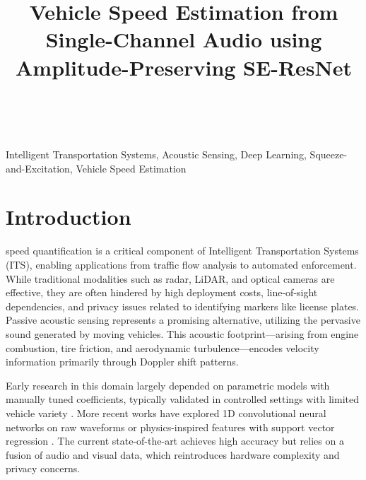 \documentclass[conference]{IEEEtran}
\begin{document}
\title{Vehicle Speed Estimation from Single-Channel Audio using Amplitude-Preserving SE-ResNet\\
}

\author{ \\
}

\maketitle

\begin{abstract}
\end{abstract}

\begin{IEEEkeywords}
Intelligent Transportation Systems, Acoustic Sensing, Deep Learning, Squeeze-and-Excitation, Vehicle Speed Estimation
\end{IEEEkeywords}

\section{Introduction}
\label{sec:introduction}
 speed quantification is a critical component of Intelligent Transportation Systems (ITS), enabling applications from traffic flow analysis to automated enforcement. While traditional modalities such as radar, LiDAR, and optical cameras are effective, they are often hindered by high deployment costs, line-of-sight dependencies, and privacy issues related to identifying markers like license plates. Passive acoustic sensing represents a promising alternative, utilizing the pervasive sound generated by moving vehicles. This acoustic footprint—arising from engine combustion, tire friction, and aerodynamic turbulence—encodes velocity information primarily through Doppler shift patterns.

Early research in this domain largely depended on parametric models with manually tuned coefficients, typically validated in controlled settings with limited vehicle variety \cite{ref1, ref2}. More recent works have explored 1D convolutional neural networks on raw waveforms \cite{ref4} or physics-inspired features with support vector regression \cite{ref5, ref13}. The current state-of-the-art \cite{ref10} achieves high accuracy but relies on a fusion of audio and visual data, which reintroduces hardware complexity and privacy concerns.
\end{document}
